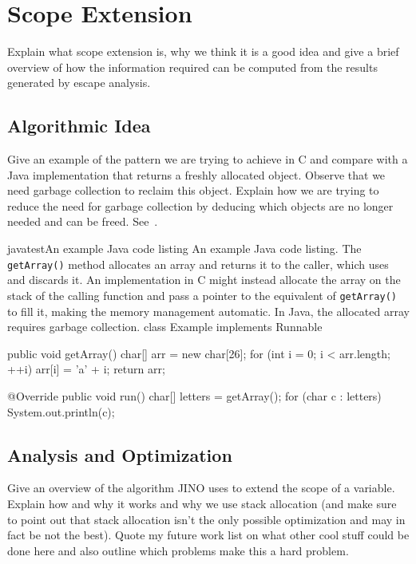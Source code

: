 
\chapter{Scope Extension}
	\label{chapter:scopeext}
	Explain what scope extension is, why we think it is a good idea and give a brief overview of how the information
	required can be computed from the results generated by escape analysis.

	\section{Algorithmic Idea}
		\label{sec:scopeext:idea}
		Give an example of the pattern we are trying to achieve in C and compare with a Java implementation that returns
		a freshly allocated object. Observe that we need garbage collection to reclaim this object. Explain how we are
		trying to reduce the need for garbage collection by deducing which objects are no longer needed and can be freed.
		See~.

		\begin{thesiscode}[gobble=4]{java}{test}{An example Java code listing}{%
				An example Java code listing. The \texttt{getArray()} method allocates an array and returns it to the caller,
				which uses and discards it. An implementation in C might instead allocate the array on the stack of the calling
				function and pass a pointer to the equivalent of \texttt{getArray()} to fill it, making the memory management
				automatic. In Java, the allocated array requires garbage collection.
			}
				class Example implements Runnable {
					public void getArray() {
						char[] arr = new char[26];
						for (int i = 0; i < arr.length; ++i) {
							arr[i] = 'a' + i;
						}
						return arr;
					}

					@Override
					public void run() {
						char[] letters = getArray();
						for (char c : letters) {
							System.out.println(c);
						}
					}
				}\end{thesiscode}

	\section{Analysis and Optimization}
		\label{sec:scopeext:analysis}
		Give an overview of the algorithm JINO uses to extend the scope of a variable. Explain how and why it works and why
		we use stack allocation (and make sure to point out that stack allocation isn't the only possible optimization and
		may in fact be not the best). Quote my future work list on what other cool stuff could be done here and also outline
		which problems make this a hard problem.

